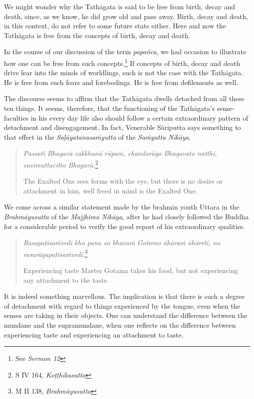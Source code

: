 We might wonder why the Tathāgata is said to be free from birth, decay and death, since, as we know, he did grow old and pass away. Birth, decay and death, in this context, do not refer to some future state either. Here and now the Tathāgata is free from the concepts of birth, decay and death.

In the course of our discussion of the term \emph{papañca}, we had occasion to illustrate how one can be free from such concepts.\footnote{See \emph{Sermon 12}} If concepts of birth, decay and death drive fear into the minds of worldlings, such is not the case with the Tathāgata. He is free from such fears and forebodings. He is free from defilements as well.

The discourse seems to affirm that the Tathāgata dwells detached from all these ten things. It seems, therefore, that the functioning of the Tathāgata's sense-faculties in his every day life also should follow a certain extraordinary pattern of detachment and disengagement. In fact, Venerable Sāriputta says something to that effect in the \emph{Saḷāyatanasaṁyutta} of the \emph{Saṁyutta Nikāya}.

\begin{quote}
\emph{Passati Bhagavā cakkhunā rūpaṁ, chandarāgo Bhagavato natthi, suvimuttacitto Bhagavā.}\footnote{S IV 164, \emph{Koṭṭhikasutta}}

The Exalted One sees forms with the eye, but there is no desire or attachment in him, well freed in mind is the Exalted One.
\end{quote}

We come across a similar statement made by the brahmin youth Uttara in the \emph{Brahmāyusutta} of the \emph{Majjhima Nikāya}, after he had closely followed the Buddha for a considerable period to verify the good report of his extraordinary qualities.

\begin{quote}
\emph{Rasapaṭisaṁvedī kho pana so bhavaṁ Gotamo āhāraṁ āhāreti, no rasarāgapaṭisaṁvedī}.\footnote{M II 138, \emph{Brahmāyusutta}}

Experiencing taste Master Gotama takes his food, but not experiencing any attachment to the taste.
\end{quote}

It is indeed something marvellous. The implication is that there is such a degree of detachment with regard to things experienced by the tongue, even when the senses are taking in their objects. One can understand the difference between the mundane and the supramundane, when one reflects on the difference between experiencing taste and experiencing an attachment to taste.

